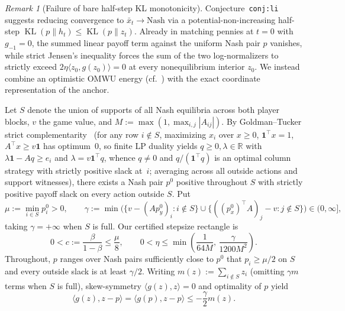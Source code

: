 \documentclass[11pt]{article}
\theoremstyle{plain}
\theoremstyle{definition}
\theoremstyle{remark}
\newtheorem{remark}{Remark}
\DeclareMathOperator{\KL}{KL}
\begin{document}
\begin{remark}[Failure of bare half-step KL monotonicity]
Conjecture~\texttt{conj:li} suggests reducing convergence to $\bar{x}_t \to \text{Nash}$ via a potential-non-increasing half-step $\KL(p \| h_t) \le \KL(p \| z_t)$. Already in matching pennies at $t = 0$ with $g_{-1} = 0$, the summed linear payoff term against the uniform Nash pair $p$ vanishes, while strict Jensen's inequality forces the sum of the two log-normalizers to strictly exceed $2\eta\langle z_0, g(z_0)\rangle = 0$ at every nonequilibrium interior $z_0$. We instead combine an optimistic OMWU energy (cf.\ \cite{Daskalakis2019,Wei2021}) with the exact coordinate representation of the anchor.
\end{remark}

Let $S$ denote the union of supports of all Nash equilibria across both player blocks, $v$ the game value, and $M := \max(1, \max_{i,j}|A_{ij}|)$. By Goldman--Tucker strict complementarity~\cite{GoldmanTucker1956} (for any row $i \notin S$, maximizing $x_i$ over $x \ge 0$, $\mathbf{1}^\top x = 1$, $A^\top x \ge v\mathbf{1}$ has optimum~$0$, so finite LP duality yields $q \ge 0, \lambda \in \mathbb{R}$ with $\lambda\mathbf{1} - Aq \ge e_i$ and $\lambda = v\mathbf{1}^\top q$, whence $q \neq 0$ and $q/(\mathbf{1}^\top q)$ is an optimal column strategy with strictly positive slack at~$i$; averaging across all outside actions and support witnesses), there exists a Nash pair $p^0$ positive throughout $S$ with strictly positive payoff slack on every action outside $S$. Put
\[
\mu := \min_{i \in S} p_i^0 > 0, \qquad
\gamma := \min\bigl(\{v - (Ap_y^0)_i : i \notin S\} \cup \{((p_x^0)^\top A)_j - v : j \notin S\}\bigr) \in (0, \infty],
\]
taking $\gamma = +\infty$ when $S$ is full. Our certified stepsize rectangle is
\begin{equation}\label{eq:rect}
0 < c := \frac{\beta}{1 - \beta} \le \frac{\mu}{8}, \qquad
0 < \eta \le \min\!\left(\frac{1}{64M},\, \frac{\gamma}{1200 M^2}\right).
\end{equation}
Throughout, $p$ ranges over Nash pairs sufficiently close to $p^0$ that $p_i \ge \mu/2$ on $S$ and every outside slack is at least $\gamma/2$. Writing $m(z) := \sum_{i \notin S} z_i$ (omitting $\gamma m$ terms when $S$ is full), skew-symmetry $\langle g(z), z\rangle = 0$ and optimality of $p$ yield
\begin{equation}\label{eq:slack}
\langle g(z), z - p \rangle = \langle g(p), z - p \rangle \le -\frac{\gamma}{2} m(z).
\end{equation}
\end{document}
